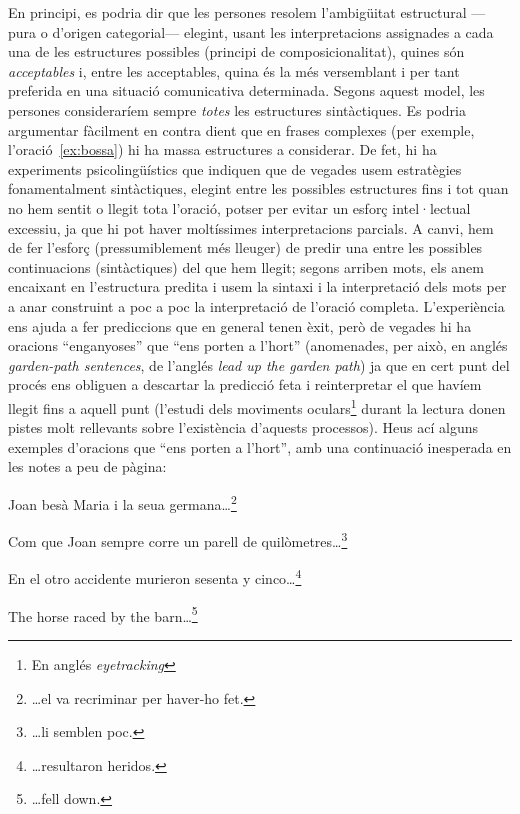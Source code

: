 En principi, es podria dir que les persones resolem l'ambigüitat
estructural ---pura o d'origen categorial--- elegint, usant les
interpretacions assignades a cada una de les estructures possibles
(principi de composicionalitat), quines són \emph{acceptables} i,
entre les acceptables, quina és la més versemblant i per tant
preferida en una situació comunicativa determinada. Segons aquest
model, les persones consideraríem sempre \emph{totes} les estructures
sintàctiques. Es podria argumentar fàcilment en contra dient que en
frases complexes (per exemple, l'oració~\ref{ex:bossa}) hi ha massa
estructures a considerar. De fet, hi ha experiments psicolingüístics
que indiquen que de vegades usem estratègies fonamentalment
sintàctiques, elegint entre les possibles estructures fins i tot quan
no hem sentit o llegit tota l'oració, potser per evitar un esforç
intel·lectual excessiu, ja que hi pot haver moltíssimes
interpretacions parcials. A canvi, hem de fer l'esforç
(pressumiblement més lleuger) de predir una entre les possibles
continuacions (sintàctiques) del que hem llegit; segons arriben mots,
els anem encaixant en l'estructura predita i usem la sintaxi i la
interpretació dels mots per a anar construint a poc a poc la
interpretació de l'oració completa.  L'experiència ens ajuda a fer
prediccions que en general tenen èxit, però de vegades hi ha oracions
``enganyoses'' que ``ens porten a l'hort'' (anomenades, per això, en
anglés \emph{garden-path sentences}, de l'anglés \emph{lead up the
  garden path}) ja que en cert punt del procés ens obliguen a
descartar la predicció feta i reinterpretar el que havíem llegit fins
a aquell punt (l'estudi dels moviments oculars\footnote{En anglés
  \emph{eyetracking}} durant la lectura donen pistes molt rellevants
sobre l'existència d'aquests processos).  Heus ací alguns exemples
d'oracions que ``ens porten a l'hort'', amb una continuació inesperada
en les notes a peu de pàgina:
\begin{exemple}
Joan besà Maria i la seua germana\ldots\footnote{\ldots el
        va recriminar per haver-ho fet.}
\end{exemple}
\begin{exemple}
    Com que Joan sempre corre un parell
      de quilòmetres\ldots\footnote{\ldots li semblen poc.}
\end{exemple}
\begin{exemple}
    En el otro accidente murieron sesenta y
      cinco\ldots\footnote{\ldots resultaron heridos.} 
\end{exemple}
\begin{exemple}
    The horse raced by the barn\ldots\footnote{\ldots fell
        down.}
\end{exemple}

